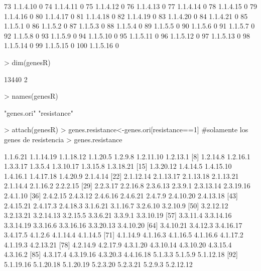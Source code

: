 \documentclass[12pt]{article}
\begin{document}
\begin{Schunk}
\begin{Soutput}
73   1.1.4.10          0
74   1.1.4.11          0
75   1.1.4.12          0
76   1.1.4.13          0
77   1.1.4.14          0
78   1.1.4.15          0
79   1.1.4.16          0
80   1.1.4.17          0
81   1.1.4.18          0
82   1.1.4.19          0
83   1.1.4.20          0
84   1.1.4.21          0
85    1.1.5.1          0
86    1.1.5.2          0
87    1.1.5.3          0
88    1.1.5.4          0
89    1.1.5.5          0
90    1.1.5.6          0
91    1.1.5.7          0
92    1.1.5.8          0
93    1.1.5.9          0
94   1.1.5.10          0
95   1.1.5.11          0
96   1.1.5.12          0
97   1.1.5.13          0
98   1.1.5.14          0
99   1.1.5.15          0
100  1.1.5.16          0
\end{Soutput}
\begin{Sinput}
> dim(genesR)
\end{Sinput}
\begin{Soutput}
[1] 13440     2
\end{Soutput}
\begin{Sinput}
> names(genesR)
\end{Sinput}
\begin{Soutput}
[1] "genes.ori"  "resistance"
\end{Soutput}
\begin{Sinput}
> attach(genesR)
> genes.resistance<-genes.ori[resistance==1] #solamente los genes de resistencia
> genes.resistance
\end{Sinput}
\begin{Soutput}
  [1] 1.1.6.21  1.1.14.19 1.1.18.12 1.1.20.5  1.2.9.8   1.2.11.10 1.2.13.1 
  [8] 1.2.14.8  1.2.16.1  1.3.3.17  1.3.5.4   1.3.10.17 1.3.15.8  1.3.18.21
 [15] 1.3.20.12 1.4.14.5  1.4.15.10 1.4.16.1  1.4.17.18 1.4.20.9  2.1.4.14 
 [22] 2.1.12.14 2.1.13.17 2.1.13.18 2.1.13.21 2.1.14.4  2.1.16.2  2.2.2.15 
 [29] 2.2.3.17  2.2.16.8  2.3.6.13  2.3.9.1   2.3.13.14 2.3.19.16 2.4.1.10 
 [36] 2.4.2.15  2.4.3.12  2.4.6.16  2.4.6.21  2.4.7.9   2.4.10.20 2.4.13.18
 [43] 2.4.15.21 2.4.17.3  2.4.18.3  3.1.6.21  3.1.16.7  3.2.6.10  3.2.10.9 
 [50] 3.2.12.12 3.2.13.21 3.2.14.13 3.2.15.5  3.3.6.21  3.3.9.1   3.3.10.19
 [57] 3.3.11.4  3.3.14.16 3.3.14.19 3.3.16.6  3.3.16.16 3.3.20.13 3.4.10.20
 [64] 3.4.10.21 3.4.12.3  3.4.16.17 3.4.17.5  4.1.2.6   4.1.14.4  4.1.14.5 
 [71] 4.1.14.9  4.1.16.3  4.1.16.5  4.1.16.6  4.1.17.2  4.1.19.3  4.2.13.21
 [78] 4.2.14.9  4.2.17.9  4.3.1.20  4.3.10.14 4.3.10.20 4.3.15.4  4.3.16.2 
 [85] 4.3.17.4  4.3.19.16 4.3.20.3  4.4.16.18 5.1.3.3   5.1.5.9   5.1.12.18
 [92] 5.1.19.16 5.1.20.18 5.1.20.19 5.2.3.20  5.2.3.21  5.2.9.3   5.2.12.12

\end{Soutput}
\end{Schunk}
\end{document}
